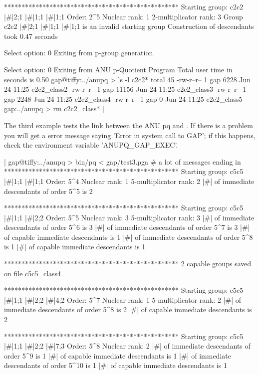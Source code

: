     **************************************************
    Starting group: c2c2 |\#|2;1 |\#|1;1 |\#|1;1
    Order: 2^5
    Nuclear rank: 1
    2-multiplicator rank: 3
    Group c2c2 |\#|2;1 |\#|1;1 |\#|1;1 is an invalid starting group
    Construction of descendants took 0.47 seconds

    Select option: 0 
    Exiting from p-group generation

    Select option: 0 
    Exiting from ANU p-Quotient Program
    Total user time in seconds is 0.50
    gap@tiffy:../anupq > ls -l c2c2*
    total 45
    -rw-r--r--    1 gap   6228 Jun 24 11:25 c2c2_class2
    -rw-r--r--    1 gap  11156 Jun 24 11:25 c2c2_class3
    -rw-r--r--    1 gap   2248 Jun 24 11:25 c2c2_class4
    -rw-r--r--    1 gap      0 Jun 24 11:25 c2c2_class5
    gap:../anupq > rm c2c2_class* |

The third example tests the link between the ANU pq and {\GAP}.  If there
is a problem you will get a error message saying
'Error in  system  call  to GAP';  if this happens, check the environment
variable 'ANUPQ\_GAP\_EXEC'.

|    gap@tiffy:../anupq > bin/pq < gap/test3.pga
    # a lot of messages ending in
    **************************************************
    Starting group: c5c5 |\#|1;1 |\#|1;1
    Order: 5^4
    Nuclear rank: 1
    5-multiplicator rank: 2
    |\#| of immediate descendants of order 5^5 is 2

    **************************************************
    Starting group: c5c5 |\#|1;1 |\#|2;2
    Order: 5^5
    Nuclear rank: 3
    5-multiplicator rank: 3
    |\#| of immediate descendants of order 5^6 is 3
    |\#| of immediate descendants of order 5^7 is 3
    |\#| of capable immediate descendants is 1
    |\#| of immediate descendants of order 5^8 is 1
    |\#| of capable immediate descendants is 1

    **************************************************
    2 capable groups saved on file c5c5_class4

    **************************************************
    Starting group: c5c5 |\#|1;1 |\#|2;2 |\#|4;2
    Order: 5^7
    Nuclear rank: 1
    5-multiplicator rank: 2
    |\#| of immediate descendants of order 5^8 is 2
    |\#| of capable immediate descendants is 2

    **************************************************
    Starting group: c5c5 |\#|1;1 |\#|2;2 |\#|7;3
    Order: 5^8
    Nuclear rank: 2
    |\#| of immediate descendants of order 5^9 is 1
    |\#| of capable immediate descendants is 1
    |\#| of immediate descendants of order 5^10 is 1
    |\#| of capable immediate descendants is 1

